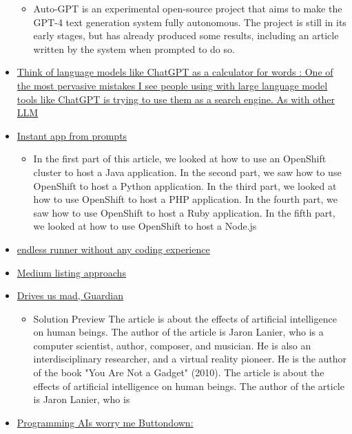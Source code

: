 \begin{itemize}
  \begin{itemize}
  \tightlist
  \item
    Auto-GPT is an experimental open-source project that aims to make
    the GPT-4 text generation system fully autonomous. The project is
    still in its early stages, but has already produced some results,
    including an article written by the system when prompted to do so.
  \end{itemize}
\item
  \href{https://simonwillison.net/2023/Apr/2/calculator-for-words/}{Think
  of language models like ChatGPT as a calculator for words : One of the
  most pervasive mistakes I see people using with large language model
  tools like ChatGPT is trying to use them as a search engine. As with
  other LLM}
\item
  \href{https://twitter.com/ronithhh/status/1641318606549176321}{Instant
  app from prompts}

  \begin{itemize}
  \tightlist
  \item
    In the first part of this article, we looked at how to use an
    OpenShift cluster to host a Java application. In the second part, we
    saw how to use OpenShift to host a Python application. In the third
    part, we looked at how to use OpenShift to host a PHP application.
    In the fourth part, we saw how to use OpenShift to host a Ruby
    application. In the fifth part, we looked at how to use OpenShift to
    host a Node.js
  \end{itemize}
\item
  \href{https://replit.com/@asrsubs/SkyRoads-GPT-4}{endless runner
  without any coding experience}
\item
  \href{https://blog.medium.com/how-were-approaching-ai-generated-writing-on-medium-16ee8cb3bc89}{Medium
  listing approachs}
\item
  \href{https://www.theguardian.com/technology/2023/mar/23/tech-guru-jaron-lanier-the-danger-isnt-that-ai-destroys-us-its-that-it-drives-us-insane}{Drives
  us mad, Guardian}

  \begin{itemize}
  \tightlist
  \item
    Solution Preview The article is about the effects of artificial
    intelligence on human beings. The author of the article is Jaron
    Lanier, who is a computer scientist, author, composer, and musician.
    He is also an interdisciplinary researcher, and a virtual reality
    pioneer. He is the author of the book "You Are Not a Gadget" (2010).
    The article is about the effects of artificial intelligence on human
    beings. The author of the article is Jaron Lanier, who is
  \end{itemize}
\item
  \href{https://buttondown.email/hillelwayne/archive/programming-ais-worry-me/}{Programming
  AIs worry me Buttondown:}


\end{itemize}
